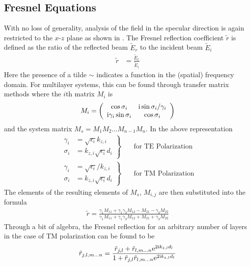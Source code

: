 \documentclass[a4paper,titlepage,onecolumn]{report}
\begin{document}
\subsection{Fresnel Equations}
With no loss of generality, analysis of the field in the specular direction
is again restricted to the $x$-$z$ plane as shown in .  The
Fresnel reflection coefficient $\tilde{r}$ is defined as the ratio of the
reflected beam $\tilde{E}_r$ to the incident beam
$\tilde{E}_i$
\begin{align}
\tilde{r} &= \frac{\tilde{E}_r}{\tilde{E}_i}
\end{align}
Here the presence of a tilde $\sim$ indicates a function in the (spatial) frequency domain.
For multilayer systems, this can be found through transfer matrix methods where the $i$th matrix $M_i$ is
\begin{align}
M_i = \left(\begin{array}{cc}
\cos \sigma_i & {\mathrm{i}} \sin \sigma_i / \gamma_i\\
{\mathrm{i}} \gamma_i \sin \sigma_i & \cos \sigma_i
\end{array}\right)
\label{eqn:tmm}
\end{align}
and the system matrix $M_s = M_1 M_2 \ldots M_{n-1} M_n$.  In the above
representation
\begin{align}
\left.\begin{aligned}
\gamma_i &= \sqrt{\epsilon_i} k_{z,i}\\
\sigma_i &= k_{z,i} \sqrt{\epsilon_i} d_i
\end{aligned}
\right\}& \quad \text{for TE Polarization}\\
\left.\begin{aligned}
\gamma_i &= \sqrt{\epsilon_i}/k_{z,i}\\
\sigma_i &= k_{z,i} \sqrt{\epsilon_i} d_i
\end{aligned}
\right\}& \quad \text{for TM Polarization}
\end{align}
The elements of the resulting elements of $M_s$, $M_{i,j}$ are then
substituted into the formula
\begin{align}
\tilde{r}=
\frac{\gamma_1 M_{11}+\gamma_1 \gamma_3 M_{12} - M_{21} - \gamma_3 M_{22}}
{\gamma_1 M_{11}+\gamma_1 \gamma_3 M_{12} + M_{21} + \gamma_3 M_{22}}
\end{align}
Through a bit of algebra, the Fresnel reflection for an arbitrary number of
layers in the case of TM polarization can be found to be
\begin{align}
\tilde{r}_{j,l,m \ldots n} = 
\frac{\tilde{r}_{j,l} + \tilde{r}_{l,m \ldots n} {\mathrm{e}}^{2 {\mathrm{i}} k_{z,l} d_l}}
{1+\tilde{r}_{j,l} \tilde{r}_{l,m \ldots n} {\mathrm{e}}^{2 {\mathrm{i}} k_{z,l} d_l}}
\label{eqn:bertnlayer}
\end{align}
\end{document}
